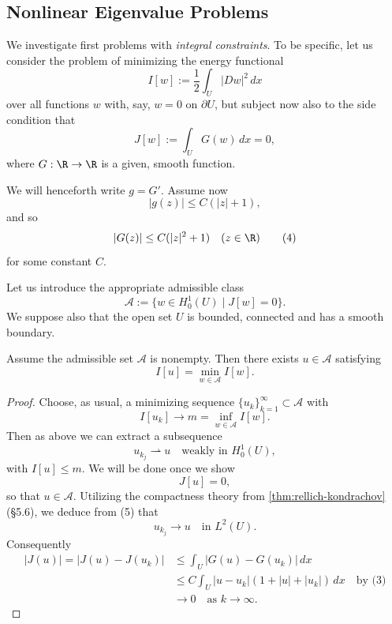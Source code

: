 \subsection{Nonlinear Eigenvalue Problems}
\label{sec:nonlinear-eigenvalue-problems}

We investigate first problems with \textit{integral constraints}. To be specific, let us consider the problem of minimizing the energy functional
\[
I[w] := \frac{1}{2} \int_U |Dw|^2\, dx
\tag{1}
\]
over all functions $w$ with, say, $w = 0$ on $\partial U$, but subject now also to the side condition that
\[
J[w] := \int_U G(w)\, dx = 0,
\tag{2}
\]
where $G : \R \to \R$ is a given, smooth function.

We will henceforth write $g = G'$. Assume now
\[
|g(z)| \leq C(|z| + 1),
\tag{3}
\]
and so
\[
|G(z)| \leq C(|z|^2 + 1) \quad (z \in \R)
\tag{4}
\]
for some constant $C$.

\begin{definition}
\label{def:admissible-class-nonlinear-eigenvalue}
Let us introduce the appropriate admissible class
\[
\mathcal{A} := \{w \in H_0^1(U) \mid J[w] = 0\}.
\]
We suppose also that the open set $U$ is bounded, connected and has a smooth boundary.
\end{definition}

\begin{theorem}
\label{thm:existence-constrained-minimizer-nonlinear-eigenvalue}
Assume the admissible set $\mathcal{A}$ is nonempty. Then there exists $u \in \mathcal{A}$ satisfying
\[
I[u] = \min_{w \in \mathcal{A}} I[w].
\]
\end{theorem}
\begin{proof}
Choose, as usual, a minimizing sequence $\{u_k\}_{k=1}^\infty \subset \mathcal{A}$ with
\[
I[u_k] \to m = \inf_{w \in \mathcal{A}} I[w].
\]
Then as above we can extract a subsequence
\[
u_{k_j} \rightharpoonup u \quad \text{weakly in } H_0^1(U),
\tag{5}
\]
with $I[u] \le m$. We will be done once we show
\[
J[u] = 0,
\tag{6}
\]
so that $u \in \mathcal{A}$. Utilizing the compactness theory from \cref{thm:rellich-kondrachov} (\S5.6), we deduce from (5) that
\[
u_{k_j} \to u \quad \text{in } L^2(U).
\tag{7}
\]
Consequently
\[
\begin{aligned}
|J(u)| = |J(u) - J(u_k)| &\le \int_U |G(u) - G(u_k)|\, dx \\
&\le C\int_U |u-u_k|(1+|u|+|u_k|)\, dx \quad \text{by (3)} \\
&\to 0 \quad \text{as } k \to \infty.
\end{aligned}
\tag{8}
\]
\end{proof}

